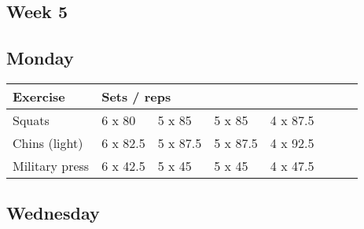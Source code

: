 \documentclass[12pt, a4paper]{article}%
\begin{document}
 \subsection*{\hspace{0.25em} Week 5 }
  \subsection*{\hspace{0.5em} Monday }


  \begin{tabular}{l|lllllll}
  \hspace{0.75em} \textbf{Exercise} & \multicolumn{ 7 }{l}{ \textbf{Sets / reps} } \\ \hline

            \hspace{0.75em} Squats
            & 6 x 80
            & 5 x 85
            & 5 x 85
            & 4 x 87.5
            & 
            & 
            & 
            \\


            \hspace{0.75em} Chins (light)
            & 6 x 82.5
            & 5 x 87.5
            & 5 x 87.5
            & 4 x 92.5
            & 
            & 
            & 
            \\


            \hspace{0.75em} Military press
            & 6 x 42.5
            & 5 x 45
            & 5 x 45
            & 4 x 47.5
            & 
            & 
            & 
            \\


  \end{tabular}

  \subsection*{\hspace{0.5em} Wednesday }
\end{document}
